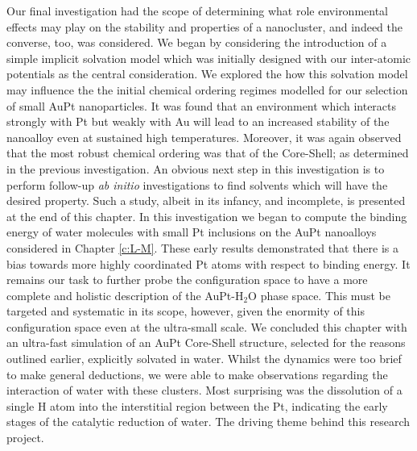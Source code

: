 Our final investigation had the scope of determining what role environmental effects may play on the stability and properties of a nanocluster, and indeed the converse, too, was considered. We began by considering the introduction of a simple implicit solvation model which was initially designed with our inter-atomic potentials as the central consideration. We explored the how this solvation model may influence the the initial chemical ordering regimes modelled for our selection of small AuPt nanoparticles. It was found that an environment which interacts strongly with Pt but weakly with Au will lead to an increased stability of the nanoalloy even at sustained high temperatures. Moreover, it was again observed that the most robust chemical ordering was that of the Core-Shell; as determined in the previous investigation. An obvious next step in this investigation is to perform follow-up \textit{ab initio} investigations to find solvents which will have the desired property. Such a study, albeit in its infancy, and incomplete, is presented at the end of this chapter. In this investigation we began to compute the binding energy of water molecules with small Pt inclusions on the AuPt nanoalloys considered in Chapter \ref{c:L-M}. These early results demonstrated that there is a bias towards more highly coordinated Pt atoms with respect to binding energy. It remains our task to further probe the configuration space to have a more complete and holistic description of the AuPt-H$_{2}$O phase space. This must be targeted and systematic in its scope, however, given the enormity of this configuration space even at the ultra-small scale. We concluded this chapter with an ultra-fast simulation of an AuPt Core-Shell structure, selected for the reasons outlined earlier, explicitly solvated in water. Whilst the dynamics were too brief to make general deductions, we were able to make observations regarding the interaction of water with these clusters. Most surprising was the dissolution of a single H atom into the interstitial region between the Pt, indicating the early stages of the catalytic reduction of water. The driving theme behind this research project.

